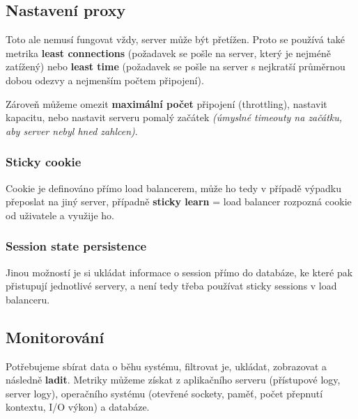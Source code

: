 \subsection{Nastavení proxy}

Toto ale nemusí fungovat vždy, server může být přetížen. Proto se používá také metrika \textbf{least connections} (požadavek se pošle na server, který je nejméně zatížený) nebo \textbf{least time} (požadavek se pošle na server s nejkratší průměrnou dobou odezvy a nejmenším počtem připojení).

Zároveň můžeme omezit \textbf{maximální počet} připojení (throttling), nastavit kapacitu, nebo nastavit serveru pomalý začátek \textit{(úmyslné timeouty na začátku, aby server nebyl hned zahlcen)}.

\subsubsection*{Sticky cookie}

Cookie je definováno přímo load balancerem, může ho tedy v případě výpadku přeposlat na jiný server, případně \textbf{sticky learn} = load balancer rozpozná cookie od uživatele a využije ho.

\subsubsection*{Session state persistence}

Jinou možností je si ukládat informace o session přímo do databáze, ke které pak přistupují jednotlivé servery, a není tedy třeba používat sticky sessions v load balanceru.

\subsection{Monitorování}

Potřebujeme sbírat data o běhu systému, filtrovat je, ukládat, zobrazovat a následně \textbf{ladit}. Metriky můžeme získat z aplikačního serveru (přístupové logy, server logy), operačního systému (otevřené sockety, paměť, počet přepnutí kontextu, I/O výkon) a databáze.


